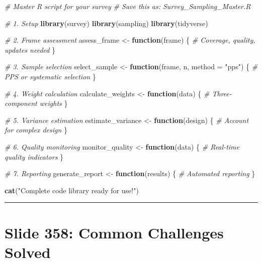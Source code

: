 \documentclass[
]{article}
\newenvironment{Shaded}{\begin{snugshade}}{\end{snugshade}}
\newcommand{\AttributeTok}[1]{\textcolor[rgb]{0.13,0.29,0.53}{#1}}
\newcommand{\CommentTok}[1]{\textcolor[rgb]{0.56,0.35,0.01}{\textit{#1}}}
\newcommand{\ControlFlowTok}[1]{\textcolor[rgb]{0.13,0.29,0.53}{\textbf{#1}}}
\newcommand{\FunctionTok}[1]{\textcolor[rgb]{0.13,0.29,0.53}{\textbf{#1}}}
\newcommand{\NormalTok}[1]{#1}
\newcommand{\OtherTok}[1]{\textcolor[rgb]{0.56,0.35,0.01}{#1}}
\newcommand{\StringTok}[1]{\textcolor[rgb]{0.31,0.60,0.02}{#1}}
\begin{document}
\begin{Shaded}
\begin{Highlighting}[]
\CommentTok{\# Master R script for your survey}
\CommentTok{\# Save this as: Survey\_Sampling\_Master.R}

\CommentTok{\# 1. Setup}
\FunctionTok{library}\NormalTok{(survey)}
\FunctionTok{library}\NormalTok{(sampling)}
\FunctionTok{library}\NormalTok{(tidyverse)}

\CommentTok{\# 2. Frame assessment}
\NormalTok{assess\_frame }\OtherTok{\textless{}{-}} \ControlFlowTok{function}\NormalTok{(frame) \{}
  \CommentTok{\# Coverage, quality, updates needed}
\NormalTok{\}}

\CommentTok{\# 3. Sample selection}
\NormalTok{select\_sample }\OtherTok{\textless{}{-}} \ControlFlowTok{function}\NormalTok{(frame, n, }\AttributeTok{method =} \StringTok{"pps"}\NormalTok{) \{}
  \CommentTok{\# PPS or systematic selection}
\NormalTok{\}}

\CommentTok{\# 4. Weight calculation}
\NormalTok{calculate\_weights }\OtherTok{\textless{}{-}} \ControlFlowTok{function}\NormalTok{(data) \{}
  \CommentTok{\# Three{-}component weights}
\NormalTok{\}}

\CommentTok{\# 5. Variance estimation  }
\NormalTok{estimate\_variance }\OtherTok{\textless{}{-}} \ControlFlowTok{function}\NormalTok{(design) \{}
  \CommentTok{\# Account for complex design}
\NormalTok{\}}

\CommentTok{\# 6. Quality monitoring}
\NormalTok{monitor\_quality }\OtherTok{\textless{}{-}} \ControlFlowTok{function}\NormalTok{(data) \{}
  \CommentTok{\# Real{-}time quality indicators}
\NormalTok{\}}

\CommentTok{\# 7. Reporting}
\NormalTok{generate\_report }\OtherTok{\textless{}{-}} \ControlFlowTok{function}\NormalTok{(results) \{}
  \CommentTok{\# Automated reporting}
\NormalTok{\}}

\FunctionTok{cat}\NormalTok{(}\StringTok{"Complete code library ready for use!"}\NormalTok{)}
\end{Highlighting}
\end{Shaded}

\begin{center}\rule{0.5\linewidth}{0.5pt}\end{center}

\section{Slide 358: Common Challenges
Solved}\label{slide-358-common-challenges-solved}
\end{document}
